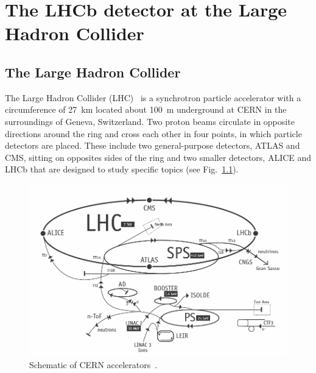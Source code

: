 \chapter{The LHCb detector at the Large Hadron Collider}
\label{ch:detector}

\section{The Large Hadron Collider}

The Large Hadron Collider (LHC)~\cite{Evans:2009zzc} is a synchrotron particle accelerator with a circumference 
of 27~km located about 100~m underground at CERN in the surroundings of Geneva, Switzerland. 
Two proton beams circulate in opposite directions around the ring and cross each
other in four points, in which particle detectors are placed. These include two general-purpose detectors, 
ATLAS and CMS, sitting on opposites sides of the ring and two smaller detectors, 
ALICE and LHCb that are designed to study specific topics (see Fig.~\ref{fig:lhc}).

\begin{figure}[h!]
\centering
\includegraphics[width=1\textwidth]{Detector/figs/LHC_scheme.png}
\caption{Schematic of CERN accelerators~\cite{Christiane:1260465}.} 
\label{fig:lhc}
\end{figure}


